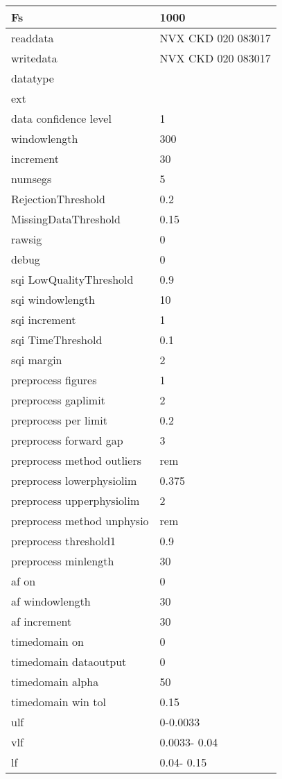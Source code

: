 \begin{tabular}{|l|l|}
\hline
Fs&1000\\\hline
readdata&NVX CKD 020 083017\\\hline
writedata&NVX CKD 020 083017\\\hline
datatype&\\\hline
ext&\\\hline
data confidence level&1\\\hline
windowlength&300\\\hline
increment&30\\\hline
numsegs&5\\\hline
RejectionThreshold&0.2\\\hline
MissingDataThreshold&0.15\\\hline
rawsig&0\\\hline
debug&0\\\hline
sqi LowQualityThreshold&0.9\\\hline
sqi windowlength&10\\\hline
sqi increment&1\\\hline
sqi TimeThreshold&0.1\\\hline
sqi margin&2\\\hline
preprocess figures&1\\\hline
preprocess gaplimit&2\\\hline
preprocess per limit&0.2\\\hline
preprocess forward gap&3\\\hline
preprocess method outliers&rem\\\hline
preprocess lowerphysiolim&0.375\\\hline
preprocess upperphysiolim&2\\\hline
preprocess method unphysio&rem\\\hline
preprocess threshold1&0.9\\\hline
preprocess minlength&30\\\hline
af on&0\\\hline
af windowlength&30\\\hline
af increment&30\\\hline
timedomain on&0\\\hline
timedomain dataoutput&0\\\hline
timedomain alpha&50\\\hline
timedomain win tol&0.15\\\hline
ulf&     0-0.0033\\\hline
vlf&0.0033-  0.04\\\hline
lf&  0.04-  0.15\\\hline

\end{tabular}
